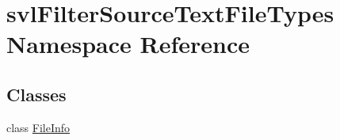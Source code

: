 \hypertarget{namespacesvl_filter_source_text_file_types}{}\section{svl\+Filter\+Source\+Text\+File\+Types Namespace Reference}
\label{namespacesvl_filter_source_text_file_types}
\subsection*{Classes}
\begin{DoxyCompactItemize}
\item 
class \hyperlink{classsvl_filter_source_text_file_types_1_1_file_info}{File\+Info}
\end{DoxyCompactItemize}
